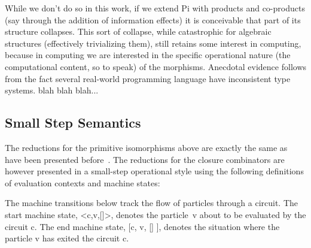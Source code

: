 \documentclass[preprint]{sigplanconf}
\begin{document}
While we don't do so in this work, if we extend {{Pi}} with products
and co-products (say through the addition of information effects) it
is conceivable that part of its structure collapses. This sort of
collapse, while catastrophic for algebraic structures (effectively
trivializing them), still retains some interest in computing, because
in computing we are interested in the specific operational nature (the
computational content, so to speak) of the morphisms. Anecdotal evidence
follows from the fact several real-world programming language have
inconsistent type systems. blah blah blah...

\subsection{Small Step Semantics}

The reductions for the primitive isomorphisms above are exactly the same as
have been presented before~\cite{infeffects}. The reductions for the closure
combinators are however presented in a small-step operational style using the
following definitions of evaluation contexts and machine states:

\begin{scriptsize}
\end{scriptsize}
The machine transitions below track the flow of particles through a
circuit. The start machine state, {{<c,v,[]>}}, denotes the
particle~{{v}} about to be evaluated by the circuit {{c}}. The end
machine state, {{[c, v, [] ]}}, denotes the situation where the particle
{{v}} has exited the circuit {{c}}.
\end{document}
